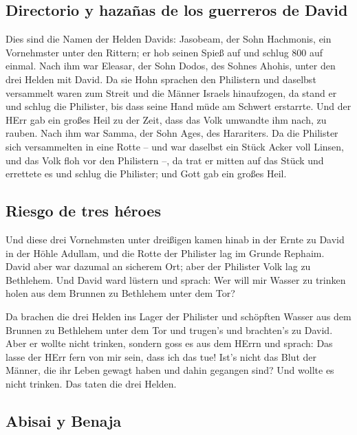 \hypertarget{directorio-y-hazauxf1as-de-los-guerreros-de-david}{%
\subsection{Directorio y hazañas de los guerreros de
David}\label{directorio-y-hazauxf1as-de-los-guerreros-de-david}}

 Dies sind die Namen der Helden Davids: Jasobeam, der Sohn
Hachmonis, ein Vornehmster unter den Rittern; er hob seinen Spieß auf
und schlug 800 auf einmal.  Nach ihm war Eleasar, der Sohn
Dodos, des Sohnes Ahohis, unter den drei Helden mit David. Da sie Hohn
sprachen den Philistern und daselbst versammelt waren zum Streit und die
Männer Israels hinaufzogen,  da stand er und schlug die
Philister, bis dass seine Hand müde am Schwert erstarrte. Und der HErr
gab ein großes Heil zu der Zeit, dass das Volk umwandte ihm nach, zu
rauben.  Nach ihm war Samma, der Sohn Ages, des
Harariters. Da die Philister sich versammelten in eine Rotte -- und war
daselbst ein Stück Acker voll Linsen, und das Volk floh vor den
Philistern --,  da trat er mitten auf das Stück und
errettete es und schlug die Philister; und Gott gab ein großes Heil.

\hypertarget{riesgo-de-tres-huxe9roes}{%
\subsection{Riesgo de tres héroes}\label{riesgo-de-tres-huxe9roes}}

 Und diese drei Vornehmsten unter dreißigen kamen hinab
in der Ernte zu David in der Höhle Adullam, und die Rotte der Philister
lag im Grunde Rephaim.  David aber war dazumal an
sicherem Ort; aber der Philister Volk lag zu Bethlehem. 
Und David ward lüstern und sprach: Wer will mir Wasser zu trinken holen
aus dem Brunnen zu Bethlehem unter dem Tor?

 Da brachen die drei Helden ins Lager der Philister und
schöpften Wasser aus dem Brunnen zu Bethlehem unter dem Tor und trugen's
und brachten's zu David. Aber er wollte nicht trinken, sondern goss es
aus dem HErrn  und sprach: Das lasse der HErr fern von
mir sein, dass ich das tue! Ist's nicht das Blut der Männer, die ihr
Leben gewagt haben und dahin gegangen sind? Und wollte es nicht trinken.
Das taten die drei Helden.

\hypertarget{abisai-y-benaja}{%
\subsection{Abisai y Benaja}\label{abisai-y-benaja}}

